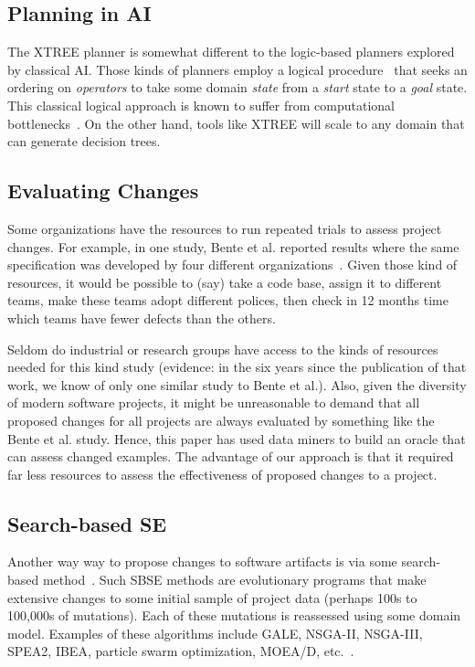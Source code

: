 \documentclass{sig-alternate}
\begin{document}
\subsection{Planning in AI}

The XTREE planner is somewhat different to the logic-based planners explored by 
classical AI. 
Those kinds of planners employ a logical procedure~\cite{Fikes1971}
that seeks an ordering on {\em operators} to take some domain
{\em state} from a {\em start} state to a {\em  goal} state.
This classical logical approach is known to suffer from
computational bottlenecks~\cite{Bylander1994}. On the other hand, tools like XTREE will scale to any domain
that can generate decision trees.
  
\subsection{Evaluating Changes}

Some organizations have the resources to 
run repeated trials to assess  project changes.
For example, in one   study, Bente et al. reported results
where the same  specification was developed by four different organizations~\cite{Anda2009}. Given those kind of resources, it would be possible
to (say) take a code base, assign it to different teams, make these teams  adopt different polices,
then check in 12 months time
 which teams have fewer defects than the others.  
 

Seldom do industrial or research groups have access
to the kinds of resources needed for this kind study  (evidence: in the six years since the
publication of that work, we know of only one   similar study to Bente et al.). Also, given the
diversity of modern software projects, it might be unreasonable to demand that all
proposed changes for all projects are always evaluated by something like the Bente et al. study.
Hence, this paper has used data miners to build an oracle that can assess changed examples. The advantage
of our approach is that it required far less resources to assess the effectiveness of proposed
changes to a project.  

\subsection{Search-based SE}

Another way way to propose changes to software artifacts
is   via some search-based method~\cite{Harman2009,Harman2011}. Such SBSE methods are   evolutionary programs that 
make
 extensive changes to  some initial sample of project data
 (perhaps 
100s to 100,000s of mutations). Each of these mutations
is reassessed using some domain model.
Examples of these algorithms include GALE, NSGA-II, NSGA-III, SPEA2, IBEA, particle swarm optimization, MOEA/D, etc.~\cite{krall14,deb00a,zit02,zit04,%
deb14,Cui2005a,zhang07:TEC}.
\end{document}
